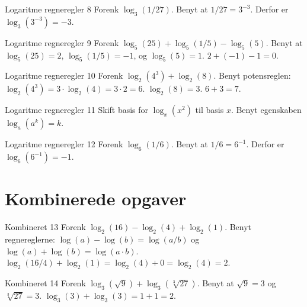 \documentclass{article}
\begin{document}
\newpage

\begin{exercise}{Logaritme regneregler 8}
Forenk $\log_3(1/27)$. 
\hint
Benyt at $1/27 = 3^{-3}$.
\hint
Derfor er $\log_3(3^{-3}) = -3$.
\end{exercise}

\newpage

\begin{exercise}{Logaritme regneregler 9}
Forenk $\log_5(25) + \log_5(1/5) - \log_5(5)$. 
\hint
Benyt at $\log_5(25) = 2$, $\log_5(1/5) = -1$, og $\log_5(5) = 1$.
\hint
$2 + (-1) - 1 = 0$.
\end{exercise}

\newpage

\begin{exercise}{Logaritme regneregler 10}
Forenk $\log_2(4^3) + \log_2(8)$. 
\hint
Benyt potensreglen: $\log_2(4^3) = 3 \cdot \log_2(4) = 3 \cdot 2 = 6$.
\hint
$\log_2(8) = 3$.
\hint
$6 + 3 = 7$.
\end{exercise}

\newpage

\begin{exercise}{Logaritme regneregler 11}
Skift basis for $\log_{x}(x^2)$ til basis $x$. 
\hint
Benyt egenskaben $\log_a(a^k) = k$.
\end{exercise}

\newpage

\begin{exercise}{Logaritme regneregler 12}
Forenk $\log_6(1/6)$. 
\hint
Benyt at $1/6 = 6^{-1}$.
\hint
Derfor er $\log_6(6^{-1}) = -1$.
\end{exercise}

\newpage

\section*{Kombinerede opgaver}

\begin{exercise}{Kombineret 13}
Forenk $\log_2(16) - \log_2(4) + \log_2(1)$. 
\hint
Benyt regnereglerne: $\log(a) - \log(b) = \log(a/b)$ og $\log(a) + \log(b) = \log(a \cdot b)$.
\hint
$\log_2(16/4) + \log_2(1) = \log_2(4) + 0 = \log_2(4) = 2$.
\end{exercise}

\newpage

\begin{exercise}{Kombineret 14}
Forenk $\log_3(\sqrt{9}) + \log_3(\sqrt[3]{27})$. 
\hint
Benyt at $\sqrt{9} = 3$ og $\sqrt[3]{27} = 3$.
\hint
$\log_3(3) + \log_3(3) = 1 + 1 = 2$.
\end{exercise}
\end{document}

